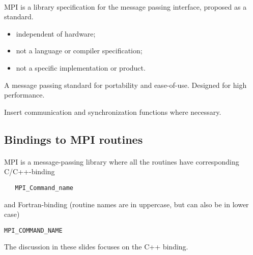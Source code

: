 \documentclass[%
oneside,                 %
final,                   %
10pt]{article}
\begin{document}
\paragraph{}
MPI is a library specification for the message passing interface,
proposed as a standard.

\begin{itemize}
\item independent of hardware;

\item not a language or compiler specification;

\item not a specific implementation or product.
\end{itemize}

\noindent
A message passing standard for portability and ease-of-use. 
Designed for high performance.

Insert communication and synchronization functions where necessary.



\subsection*{Bindings to MPI routines}

\paragraph{}

MPI is a message-passing library where all the routines
have corresponding C/C++-binding


\begin{verbatim}
   MPI_Command_name

\end{verbatim}

and Fortran-binding (routine names are in uppercase, but can also be in lower case)


\begin{Verbatim}[numbers=none,fontsize=\fontsize{9pt}{9pt},baselinestretch=0.95]
   MPI_COMMAND_NAME

\end{Verbatim}

The discussion in these slides focuses on the C++ binding.
\end{document}
